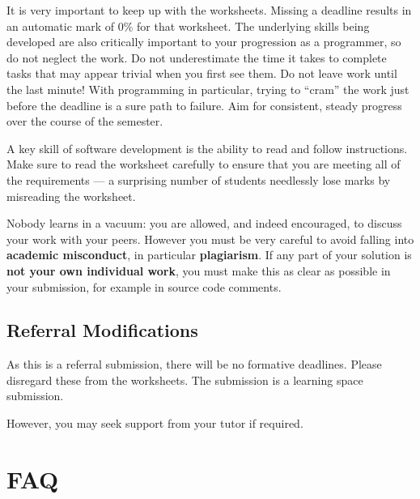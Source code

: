 \documentclass{../../fal_assignment}
\begin{document}
It is very important to keep up with the worksheets. Missing a deadline results in an automatic mark of 0\% for that worksheet.
The underlying skills being developed are also critically important to your progression as a programmer, so do not neglect the work.
Do not underestimate the time it takes to complete tasks that may appear trivial when you first see them.
Do not leave work until the last minute! With programming in particular, trying to ``cram'' the work just before the deadline is a sure path to failure. Aim for consistent, steady progress over the course of the semester.

A key skill of software development is the ability to read and follow instructions.
Make sure to read the worksheet carefully to ensure that you are meeting all of the requirements ---
a surprising number of students needlessly lose marks by misreading the worksheet.

Nobody learns in a vacuum: you are allowed, and indeed encouraged, to discuss your work with your peers. However you must be very careful to avoid falling into \textbf{academic misconduct}, in particular \textbf{plagiarism}. If any part of your solution is \textbf{not your own individual work}, you must make this as clear as possible in your submission, for example in source code comments.


\subsection*{Referral Modifications}
As this is a referral submission, there will be no formative deadlines. Please disregard these from the worksheets. The submission is a learning space submission.

However, you may seek support from your tutor if required.

\section*{FAQ}
\end{document}
